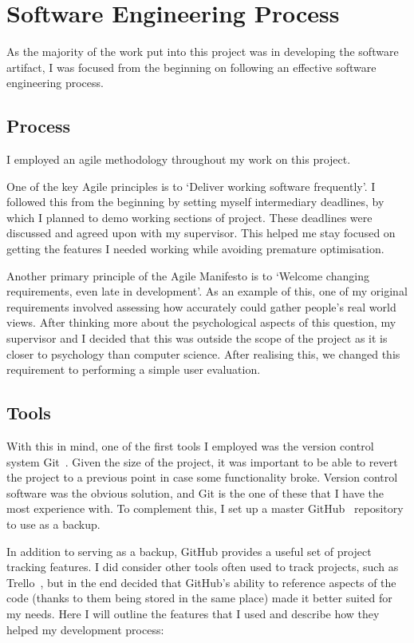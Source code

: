 \chapter{Software Engineering Process}

As the majority of the work put into this project was in developing the software artifact, I was focused from the beginning on following an effective software engineering process.

\section{Process}
I employed an agile\cite{Agile} methodology throughout my work on this project. 

One of the key Agile principles is to `Deliver working software frequently'\cite{AgileKey}. 
I followed this from the beginning by setting myself intermediary deadlines, by which I planned to demo working sections of project. 
These deadlines were discussed and agreed upon with my supervisor. 
This helped me stay focused on getting the features I needed working while avoiding premature optimisation.

Another primary principle of the Agile Manifesto is to `Welcome changing requirements, even late in development'\cite{AgileKey}. 
As an example of this, one of my original requirements involved assessing how accurately \od{} could gather people's real world views. 
After thinking more about the psychological aspects of this question, my supervisor and I decided that this was outside the scope of the project as it is closer to psychology than computer science. 
After realising this, we changed this requirement to performing a simple user evaluation. 

\section{Tools}
With this in mind, one of the first tools I employed was the version control system Git~\cite{Git}.
Given the size of the project, it was important to be able to revert the project to a previous point in case some functionality broke.
Version control software was the obvious solution, and Git is the one of these that I have the most experience with. To complement this, I set up a master GitHub~\cite{GitHub} repository to use as a backup.

In addition to serving as a backup, GitHub provides a useful set of project tracking features. 
I did consider other tools often used to track projects, such as Trello~\cite{Trello}, but in the end decided that GitHub's ability to reference aspects of the code (thanks to them being stored in the same place) made it better suited for my needs. 
Here I will outline the features that I used and describe how they helped my development process:


